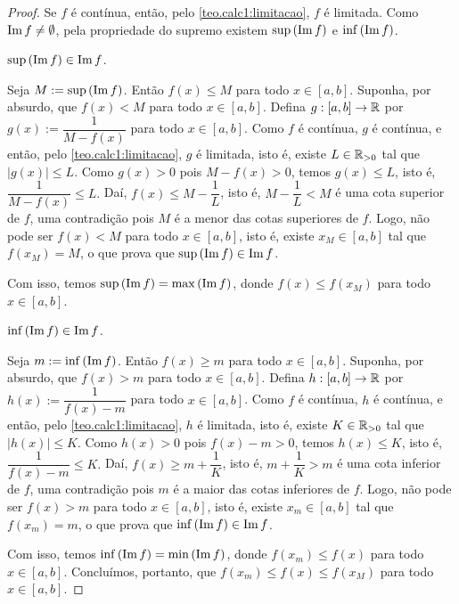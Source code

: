 \begin{proof}
    Se $f$ é contínua, então, pelo \cref{teo.calc1:limitacao}, $f$ é limitada. Como $\operatorname{Im} f \neq \emptyset$, pela propriedade do supremo existem $\sup \, (\operatorname{Im} f)$ e $\inf \, (\operatorname{Im} f)$.
        \begin{claim}
            $\sup \, (\operatorname{Im} f) \in \operatorname{Im} f$.
        \end{claim}
        \begin{midproof}
            Seja $M := \sup \, (\operatorname{Im} f)$. Então $f(x) \leq M$ para todo $x \in [a,b]$. Suponha, por absurdo, que $f(x) < M$ para todo $x \in [a,b]$. Defina $g : [a,b] \to \mathbb{R}$ por
                $
                    g(x) := \dfrac{1}{M- f(x)}
                $
            para todo $x \in [a,b]$. Como $f$ é contínua, $g$ é contínua, e então, pelo \cref{teo.calc1:limitacao}, $g$ é limitada, isto é, existe $L \in \mathbb{R}_{>0}$ tal que $|g(x)| \leq L$. Como $g(x) > 0$ pois $M - f(x) > 0$, temos $g(x) \leq L$, isto é,
                $
                    \dfrac{1}{M- f(x)} \leq L.
                $
            Daí, $f(x) \leq M - \dfrac{1}{L}$, isto é, $M - \dfrac{1}{L} < M$ é uma cota superior de $f$, uma contradição pois $M$ é a menor das cotas superiores de $f$. Logo, não pode ser $f(x) < M$ para todo $x \in [a,b]$, isto é, existe $x_M \in [a,b]$ tal que $f(x_M) = M$, o que prova que  $\sup \, (\operatorname{Im} f) \in \operatorname{Im} f$. \whiteproof
        \end{midproof}
    Com isso, temos $\sup \, (\operatorname{Im} f) = \max \, (\operatorname{Im} f)$, donde $f(x) \leq f(x_M)$ para todo $x \in [a,b]$.
        \begin{claim}
            $\inf \, (\operatorname{Im} f) \in \operatorname{Im} f$.
        \end{claim}
        \begin{midproof}
            Seja $m := \inf \, (\operatorname{Im} f)$. Então $f(x) \geq m$ para todo $x \in [a,b]$. Suponha, por absurdo, que $f(x) > m$ para todo $x \in [a,b]$. Defina $h : [a,b] \to \mathbb{R}$ por
                $
                    h(x) := \dfrac{1}{f(x) - m}
                $
            para todo $x \in [a,b]$. Como $f$ é contínua, $h$ é contínua, e então, pelo \cref{teo.calc1:limitacao}, $h$ é limitada, isto é, existe $K \in \mathbb{R}_{>0}$ tal que $|h(x)| \leq K$. Como $h(x) > 0$ pois $f(x) - m > 0$, temos $h(x) \leq K$, isto é,
                $
                    \dfrac{1}{f(x) - m} \leq K.
                $
            Daí, $f(x) \geq m + \dfrac{1}{K}$, isto é, $m + \dfrac{1}{K} > m$ é uma cota inferior de $f$, uma contradição pois $m$ é a maior das cotas inferiores de $f$. Logo, não pode ser $f(x) > m$ para todo $x \in [a,b]$, isto é, existe $x_m \in [a,b]$ tal que $f(x_m) = m$, o que prova que  $\inf \, (\operatorname{Im} f) \in \operatorname{Im} f$. \whiteproof
        \end{midproof}
    Com isso, temos $\inf \, (\operatorname{Im} f) = \min \, (\operatorname{Im} f)$, donde $f(x_m) \leq f(x)$ para todo $x \in [a,b]$. Concluímos, portanto, que $f(x_m) \leq f(x) \leq f(x_M)$ para todo $x \in [a,b]$. \blackproof
\end{proof}


